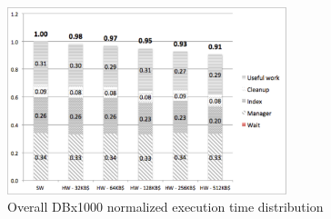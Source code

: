 \begin{figure}[h]
  \centering
  \includegraphics[width=3.2in]{figures/dbx1000_run_time.pdf}
  \caption{Overall DBx1000 normalized execution time distribution}
  \label{fig:dbx1000_run_time}
\end{figure}
